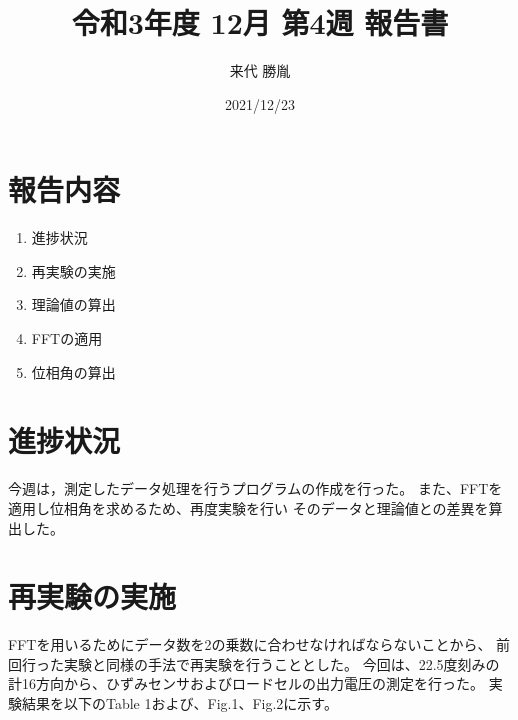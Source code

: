 \documentclass[twocolumn,a4j]{jsarticle}
\author{来代 勝胤}
\title{令和3年度 12月 第4週 報告書}
\date{2021/12/23}
\begin{document}
\columnseprule=0.1mm

\maketitle
\section*{報告内容}
\begin{enumerate}[1.]
    \item 進捗状況
    \item 再実験の実施
    \item 理論値の算出
    \item FFTの適用
    \item 位相角の算出
\end{enumerate}

\section{進捗状況}
今週は，測定したデータ処理を行うプログラムの作成を行った。
また、FFTを適用し位相角を求めるため、再度実験を行い
そのデータと理論値との差異を算出した。

\section{再実験の実施}
FFTを用いるためにデータ数を2の乗数に合わせなければならないことから、
前回行った実験と同様の手法で再実験を行うこととした。
今回は、22.5度刻みの計16方向から、ひずみセンサおよびロードセルの出力電圧の測定を行った。
実験結果を以下のTable 1および、Fig.1、Fig.2に示す。\\
\end{document}
